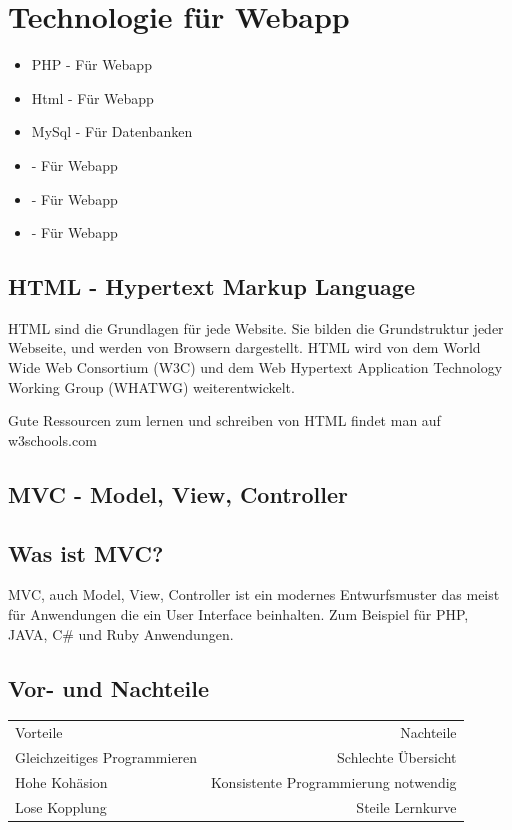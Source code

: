 \newpage	
\def \currentAuthor {Florian Tipotsch}
	\section{Technologie für Webapp}
\begin{itemize}
	\item PHP - Für Webapp
	\item Html - Für Webapp 	
	\item MySql - Für Datenbanken
	\item {} - Für Webapp
	\item {} - Für Webapp
	\item {} - Für Webapp 
\end{itemize}
	\subsection{HTML - Hypertext Markup Language}
	HTML sind die Grundlagen für jede Website. Sie bilden die Grundstruktur jeder Webseite, und werden von Browsern dargestellt. HTML wird von dem World Wide Web Consortium (W3C) \cite{W3C} und dem Web Hypertext Application Technology Working Group (WHATWG) \cite{WHATWG} weiterentwickelt.
	
	Gute Ressourcen zum lernen und schreiben von HTML findet man auf w3schools.com \cite {W3schools}
	
	\subsection{MVC - Model, View, Controller}\label{sec:MVC}
	
	\subsection{Was ist MVC?} 
	MVC, auch Model, View, Controller ist ein modernes Entwurfsmuster das meist für Anwendungen die ein User Interface beinhalten. Zum Beispiel für PHP, JAVA, C\# und Ruby Anwendungen. \cite{MVC}
	
	\subsection{Vor- und Nachteile}
	\begin{tabular}{ l r }
		Vorteile & Nachteile \\
		Gleichzeitiges Programmieren & Schlechte Übersicht \\
		Hohe Kohäsion \cite{kohaesion} & Konsistente Programmierung notwendig\\
		Lose Kopplung \cite{kopplung} & Steile Lernkurve \\	
	\end{tabular}



